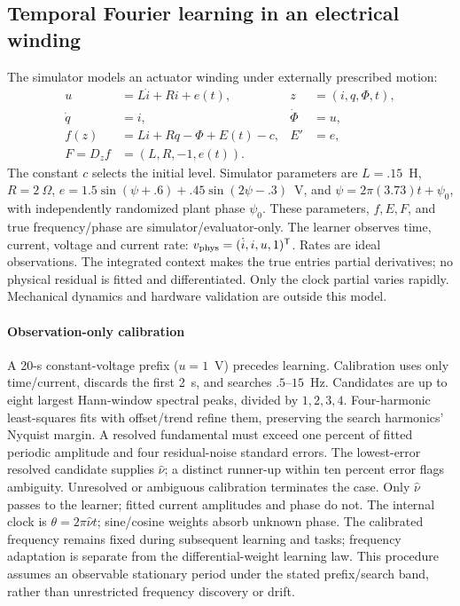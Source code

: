\subsection{Temporal Fourier learning in an electrical winding}
\label{sec:direct_fourier_protocol}
The simulator models an actuator winding under externally prescribed motion:
\begin{align}
 u&=L\dot i+Ri+e(t),&z&=(i,q,\Phi,t),\nonumber\\
 \dot q&=i,&\dot\Phi&=u,\nonumber\\
 f(z)&=Li+Rq-\Phi+E(t)-c,&E'&=e,\nonumber\\
 F=D_zf&=(L,R,-1,e(t)).\label{eq:df_graph}
\end{align}
The constant $c$ selects the initial level. Simulator parameters are
$L=.15$~H, $R=2~\Omega$,
$e=1.5\sin(\psi+.6)+.45\sin(2\psi-.3)$~V, and
$\psi=2\pi(3.73)t+\psi_0$, with independently randomized plant phase
$\psi_0$. These parameters, $f,E,F$, and true frequency/phase are
simulator/evaluator-only. The learner observes time, current, voltage and
current rate: $v_{\rm phys}=(\dot i,i,u,1)^{\mathsf T}$.
Rates are ideal observations. The integrated context makes the true entries
partial derivatives; no physical residual is fitted and differentiated.
Only the clock partial varies rapidly. Mechanical dynamics and hardware
validation are outside this model.

\paragraph{Observation-only calibration}
A 20-s constant-voltage prefix ($u=1$~V) precedes learning. Calibration uses
only time/current, discards the first 2~s, and searches $.5$--$15$~Hz.
Candidates are up to eight largest Hann-window spectral peaks, divided
by $1,2,3,4$. Four-harmonic least-squares fits with offset/trend refine
them, preserving the search harmonics' Nyquist margin. A resolved fundamental
must exceed one percent of fitted periodic amplitude and four residual-noise
standard errors. The lowest-error resolved candidate supplies $\widehat\nu$;
a distinct runner-up within ten percent error flags ambiguity. Unresolved
or ambiguous calibration terminates the case. Only $\widehat\nu$ passes to
the learner; fitted current amplitudes and phase do not. The internal clock
is $\theta=2\pi\widehat\nu t$; sine/cosine weights absorb unknown phase.
The calibrated frequency remains fixed during subsequent learning and tasks;
frequency adaptation is separate from the differential-weight learning law.
This procedure assumes an observable stationary period under the stated
prefix/search band, rather than unrestricted frequency discovery or drift.

